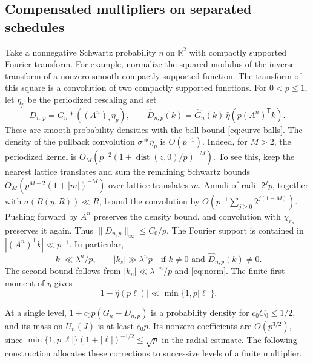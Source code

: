 \documentclass[11pt,a4paper,reqno]{amsart}
\theoremstyle{definition}
\theoremstyle{remark}
\numberwithin{equation}{section}
\begin{document}
\subsection{Compensated multipliers on separated schedules}
Take a nonnegative Schwartz probability \(\eta\) on \(\mathbb R^2\)
with compactly supported Fourier transform. For example, normalize the
squared modulus of the inverse transform of a nonzero smooth
compactly supported function. The transform of this square is a
convolution of two compactly supported functions. For \(0<p\le1\), let
\(\eta_p\) be the periodized rescaling and set
\[
 D_{n,p}=G_n*((A^n)_*\eta_p),\qquad
 \widehat D_{n,p}(k)=\widehat G_n(k)\,
                         \widehat\eta(p(A^n)^{\mathsf T}k).
\]
These are smooth probability densities with the ball bound
\eqref{eq:curve-balls}. The density of the pullback convolution
\(\sigma*\eta_p\) is \(O(p^{-1})\). Indeed, for \(M>2\), the
periodized kernel is
\(O_M(p^{-2}(1+\operatorname{dist}(z,0)/p)^{-M})\).
To see this, keep the nearest lattice translates and sum the remaining
Schwartz bounds \(O_M(p^{M-2}(1+|m|)^{-M})\) over lattice translates
\(m\). Annuli of radii \(2^j p\), together with
\(\sigma(B(y,R))\ll R\), bound the convolution by
\(O(p^{-1}\sum_{j\ge0}2^{j(1-M)})\). Pushing forward by \(A^n\)
preserves the density bound, and convolution with \(\chi_{r_n}\)
preserves it again. Thus \(\|D_{n,p}\|_\infty\le C_0/p\).
The Fourier support is contained in \(|(A^n)^{\mathsf T}k|\ll p^{-1}\).
In particular,
\begin{equation}\label{eq:curve-band}
 |k|\ll\lambda^n/p,\qquad
 |k_s|\gg\lambda^n p \quad\text{if }k\ne0
 \text{ and }\widehat D_{n,p}(k)\ne0.
\end{equation}
The second bound follows from \(|k_u|\ll\lambda^{-n}/p\) and
\eqref{eq:norm}. The finite first moment of \(\eta\) gives
\begin{equation}\label{eq:curve-cancel}
                 |1-\widehat\eta(p\ell)|\ll\min\{1,p|\ell|\}.
\end{equation}

At a single level, \(1+c_0p(G_n-D_{n,p})\) is a probability density
for \(c_0 C_0\le 1/2\), and its mass on \(U_n(J)\) is at least \(c_0p\).
Its nonzero coefficients are \(O(p^{3/2})\), since
\(\min\{1,p|\ell|\}(1+|\ell|)^{-1/2}\le\sqrt p\) in the radial
estimate. The following construction allocates these corrections to
successive levels of a finite multiplier.
\end{document}
